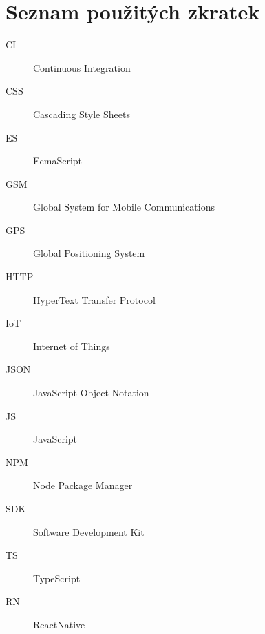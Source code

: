 \chapter*{Seznam použitých zkratek}

\begin{multicols}{2}
\raggedright
\begin{description}
\item [CI] Continuous Integration
\item[CSS] Cascading Style Sheets
\item [ES] EcmaScript
\item [GSM] Global System for Mobile Communications
\item [GPS] Global Positioning System
\item [HTTP] HyperText Transfer Protocol
\item [IoT] Internet of Things
\item [JSON] JavaScript Object Notation
\item [JS] JavaScript
\item [NPM] Node Package Manager
\item [SDK] Software Development Kit
\item [TS] TypeScript
\item [RN] ReactNative
\end{description}
\end{multicols}

